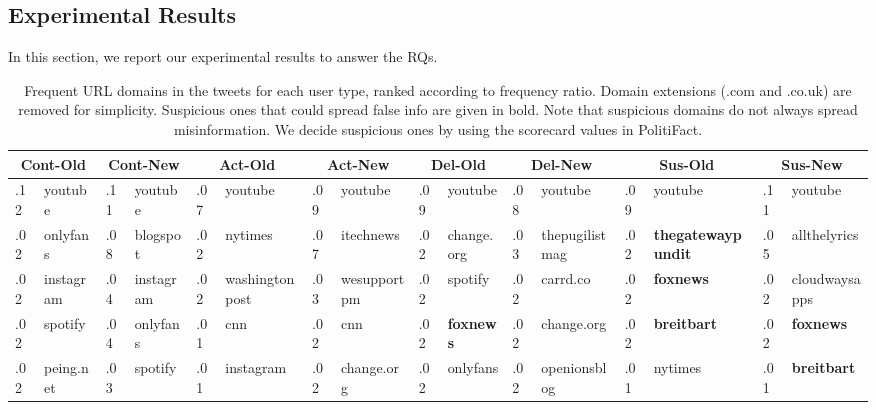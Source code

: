 \documentclass[sigconf]{acmart}
\begin{document}
\subsection{Experimental Results}
In this section, we report our experimental results to answer the RQs. 

\begin{table*}[ht]
\fontsize{9}{10.8}\selectfont
\caption{Frequent URL domains in the tweets for each user type, ranked according to frequency ratio. Domain extensions (.com and .co.uk) are removed for simplicity. Suspicious ones that could spread false info are given in bold. Note that suspicious domains do not always spread misinformation. We decide suspicious ones by using the scorecard values in PolitiFact.}
\label{tab:url_statistics}
\centering
\setlength{\tabcolsep}{1pt}
\begin{tabular}{|l|l|l|l|l|l|l|l|l|l|l|l|l|l|l|l|}
\hline
\multicolumn{2}{|c}{\textbf{Cont-Old}} &
\multicolumn{2}{|c}{\textbf{Cont-New}} &
\multicolumn{2}{|c}{\textbf{Act-Old}} & \multicolumn{2}{|c}{\textbf{Act-New}} & \multicolumn{2}{|c}{\textbf{Del-Old}} & \multicolumn{2}{|c}{\textbf{Del-New}} & \multicolumn{2}{|c}{\textbf{Sus-Old}} & \multicolumn{2}{|c|}{\textbf{Sus-New}} \\
\hline
\cline{1-16} \cline{1-16} \cline{1-16} \cline{1-16} 
.12 & youtube & .11 & youtube & .07 & youtube & .09 & youtube & .09 & youtube & .08 & youtube & .09 & youtube & .11 & youtube \\

.02 & onlyfans & .08 & blogspot & .02 & nytimes & .07 & itechnews & .02 & change.org & .03 & thepugilistmag & .02 & \textbf{thegatewaypundit} & .05 & allthelyrics \\

.02 & instagram & .04 & instagram & .02 & washingtonpost & .03 & wesupportpm & .02 & spotify & .02 & carrd.co & .02 & \textbf{foxnews} & .02 & cloudwaysapps \\

.02 & spotify & .04 & onlyfans & .01 & cnn & .02 & cnn & .02 & \textbf{foxnews} & .02 & change.org & .02 & \textbf{breitbart} & .02 & \textbf{foxnews} \\

.02 & peing.net & .03 & spotify & .01 & instagram & .02 & change.org & .02 & onlyfans & .02 & openionsblog & .01 & nytimes & .01 & \textbf{breitbart} \\

\hline
\end{tabular}
\end{table*}
\end{document}
